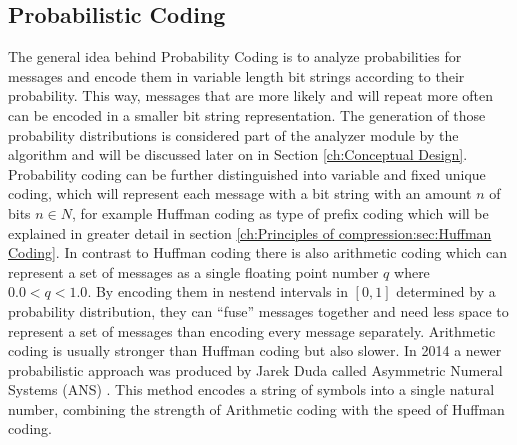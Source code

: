 \subsection{Probabilistic Coding}
\par{
The general idea behind Probability Coding is to analyze probabilities for messages and encode them in variable length bit strings according to their probability. This way, messages that are more likely and will repeat more often can be encoded in a smaller bit string representation. The generation of those probability distributions is considered part of the analyzer module by the algorithm and will be discussed later on in Section \ref{ch:Conceptual Design}. Probability coding can be further distinguished into variable and fixed unique coding, which will represent each message with a bit string with an amount $n$ of bits $n \in N$, for example Huffman coding as type of prefix coding which will be explained in greater detail in section \ref{ch:Principles of compression:sec:Huffman Coding}. In contrast to Huffman coding there is also arithmetic coding which can represent a set of messages as a single floating point number $q$ where $0.0 < q < 1.0$. By encoding them in nestend intervals in $[0,1]$ determined by a probability distribution, they can \enquote{fuse} messages together and need less space to represent a set of messages than encoding every message separately. Arithmetic coding is usually stronger than Huffman coding but also slower. In 2014 a newer probabilistic approach was produced by Jarek Duda called Asymmetric Numeral Systems (ANS) \cite{DBLP:journals/corr/Duda13}. This method encodes a string of symbols into a single natural number, combining the strength of Arithmetic coding with the speed of Huffman coding.
}

